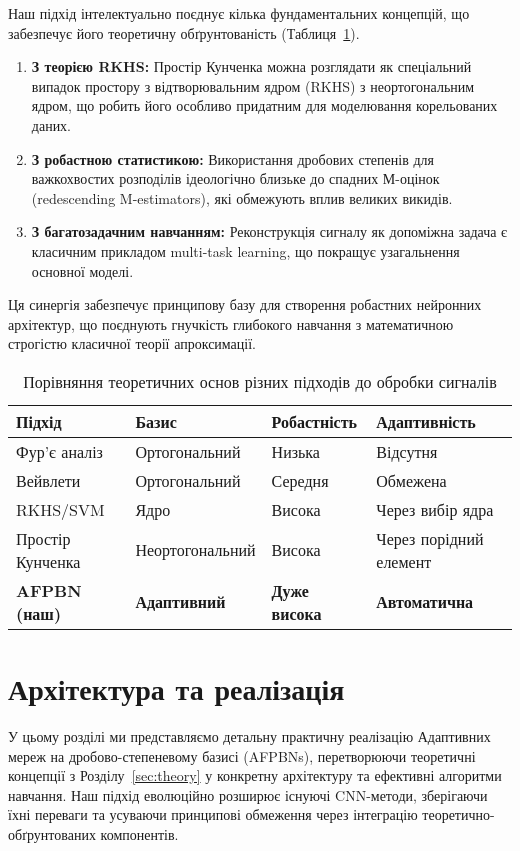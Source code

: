 \documentclass[12pt,a4paper]{article}
\begin{document}
Наш підхід інтелектуально поєднує кілька фундаментальних концепцій, що забезпечує його теоретичну обґрунтованість (Таблиця~\ref{tab:theory_comparison}).
\begin{enumerate}
	\item \textbf{З теорією RKHS:} Простір Кунченка можна розглядати як спеціальний випадок простору з відтворювальним ядром (RKHS) з неортогональним ядром, що робить його особливо придатним для моделювання корельованих даних.
	\item \textbf{З робастною статистикою:} Використання дробових степенів для важкохвостих розподілів ідеологічно близьке до спадних М-оцінок (redescending M-estimators), які обмежують вплив великих викидів.
	\item \textbf{З багатозадачним навчанням:} Реконструкція сигналу як допоміжна задача є класичним прикладом multi-task learning, що покращує узагальнення основної моделі.
\end{enumerate}
Ця синергія забезпечує принципову базу для створення робастних нейронних архітектур, що поєднують гнучкість глибокого навчання з математичною строгістю класичної теорії апроксимації.

\begin{table}[htbp]
	\centering
	\caption{Порівняння теоретичних основ різних підходів до обробки сигналів}
	\label{tab:theory_comparison}
	\begin{tabular}{@{}llll@{}}
		\toprule
		\textbf{Підхід} & \textbf{Базис} & \textbf{Робастність} & \textbf{Адаптивність} \\
		\midrule
		Фур'є аналіз & Ортогональний & Низька & Відсутня \\
		Вейвлети & Ортогональний & Середня & Обмежена \\
		RKHS/SVM & Ядро & Висока & Через вибір ядра \\
		Простір Кунченка & Неортогональний & Висока & Через порідний елемент \\
		\textbf{AFPBN (наш)} & \textbf{Адаптивний} & \textbf{Дуже висока} & \textbf{Автоматична} \\
		\bottomrule
	\end{tabular}
\end{table}
	
\section{Архітектура та реалізація}
\label{sec:implementation}

У цьому розділі ми представляємо детальну практичну реалізацію Адаптивних мереж на дробово-степеневому базисі (AFPBNs), перетворюючи теоретичні концепції з Розділу~\ref{sec:theory} у конкретну архітектуру та ефективні алгоритми навчання. Наш підхід еволюційно розширює існуючі CNN-методи, зберігаючи їхні переваги та усуваючи принципові обмеження через інтеграцію теоретично-обґрунтованих компонентів.
\end{document}
